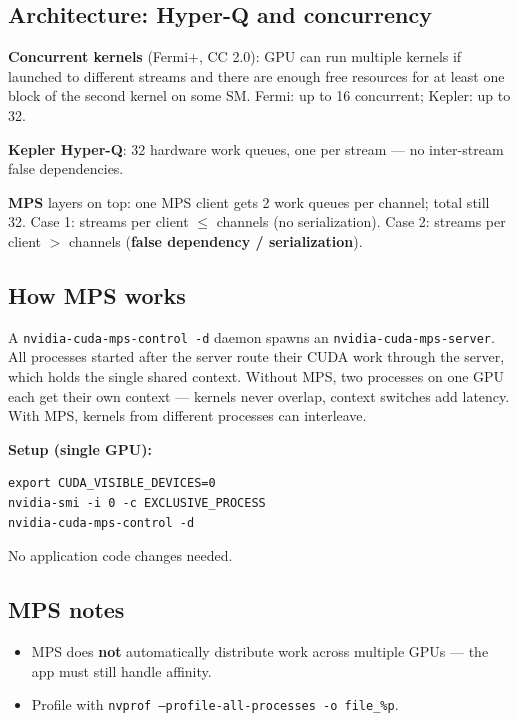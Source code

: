 \documentclass[10pt]{article}
\begin{document}
\subsection*{Architecture: Hyper-Q and concurrency}
\textbf{Concurrent kernels} (Fermi+, CC 2.0): GPU can run multiple kernels if launched to different streams and there are enough free resources for at least one block of the second kernel on some SM. Fermi: up to 16 concurrent; Kepler: up to 32.

\textbf{Kepler Hyper-Q}: 32 hardware work queues, one per stream — no inter-stream false dependencies.

\textbf{MPS} layers on top: one MPS client gets 2 work queues per channel; total still 32. Case 1: streams per client $\leq$ channels (no serialization). Case 2: streams per client $>$ channels (\textbf{false dependency / serialization}).

\subsection*{How MPS works}
A \texttt{nvidia-cuda-mps-control -d} daemon spawns an \texttt{nvidia-cuda-mps-server}. All processes started after the server route their CUDA work through the server, which holds the single shared context. Without MPS, two processes on one GPU each get their own context — kernels never overlap, context switches add latency. With MPS, kernels from different processes can interleave.

\begin{keybox}
\textbf{Setup (single GPU):}
\begin{verbatim}
export CUDA_VISIBLE_DEVICES=0
nvidia-smi -i 0 -c EXCLUSIVE_PROCESS
nvidia-cuda-mps-control -d
\end{verbatim}
No application code changes needed.
\end{keybox}

\subsection*{MPS notes}
\begin{itemize}
  \item MPS does \textbf{not} automatically distribute work across multiple GPUs — the app must still handle affinity.
  \item Profile with \texttt{nvprof --profile-all-processes -o file\_\%p}.
\end{itemize}

\hrulefill
\end{document}
